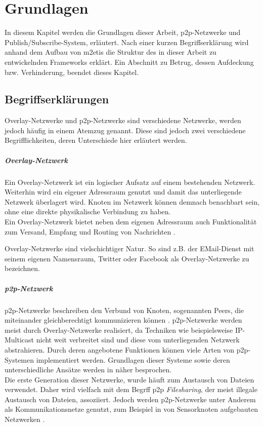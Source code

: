 \chapter{Grundlagen}
\label{chap:grundlagen}

In diesem Kapitel werden die Grundlagen dieser Arbeit, \ac{p2p}-Netzwerke und Publish/Subscribe-System, erläutert. Nach einer kurzen Begriffserklärung wird anhand dem Aufbau von \ac{m2etis} die Struktur des in dieser Arbeit zu entwickelnden Frameworks erklärt. Ein Abschnitt zu Betrug, dessen Aufdeckung bzw. Verhinderung, beendet dieses Kapitel.

\section{Begriffserklärungen}

Overlay-Netzwerke und \ac{p2p}-Netzwerke sind verschiedene Netzwerke, werden jedoch häufig in einem Atemzug genannt. Diese sind jedoch zwei verschiedene Begrifflichkeiten, deren Unterschiede hier erläutert werden.

\paragraph{Overlay-Netzwerk} Ein Overlay-Netzwerk ist ein logischer Aufsatz auf einem bestehenden Netzwerk. Weiterhin wird ein eigener Adressraum genutzt und damit das unterliegende Netzwerk überlagert wird. Knoten im Netzwerk können demnach benachbart sein, ohne eine direkte physikalische Verbindung zu haben.\\
Ein Overlay-Netzwerk bietet neben dem eigenen Adressraum auch Funktionalität zum Versand, Empfang und Routing von Nachrichten \cite{Tannenbaum2003}.

Overlay-Netzwerke sind vielschichtiger Natur. So sind z.B. der EMail-Dienst mit seinem eigenen Namensraum, Twitter oder Facebook als Overlay-Netzwerke zu bezeichnen.

\paragraph{\ac{p2p}-Netzwerk} p2p-Netzwerke beschreiben den Verbund von Knoten, sogenannten Peers, die miteinander gleichberechtigt kommunizieren können \cite{Steinmetz2005}. p2p-Netzwerke werden meist durch Overlay-Netzwerke realisiert, da Techniken wie beispielsweise IP-Multicast \cite{Deering1990Multicast} nicht weit verbreitet sind und diese vom unterliegenden Netzwerk abstrahieren. Durch deren angebotene Funktionen können viele Arten von p2p-Systemen implementiert werden. Grundlagen dieser Systeme sowie deren unterschiedliche Ansätze werden in  näher besprochen.\\
Die erste Generation dieser Netzwerke, wurde häuft zum Austausch von Dateien verwendet. Daher wird vielfach mit dem Begrff \ac{p2p} \emph{Filesharing}, der meist illegale Austausch von Dateien, assoziiert. Jedoch werden p2p-Netzwerke unter Anderem als Kommunikationsnetze genutzt, zum Beispiel in von Sensorknoten aufgebauten Netzwerken \cite{MuneebAliandKoenLangendoen2007Case, Darlagiannis2006Peertopeer}.

